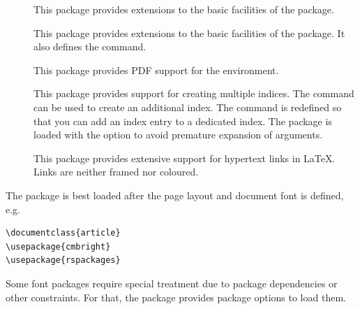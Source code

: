 \documentclass{scrartcl}
\begin{document}
\begin{description}
\item[\href{https://mirrors.ctan.org/macros/latex/contrib/xcolor/xcolor.pdf}{}]
This package provides extensions to the basic facilities of the
 package.

\item[\href{https://mirrors.ctan.org/macros/latex/required/graphics/grfguide.pdf}{}]
This package provides extensions to the basic facilities of the
 package.  It also defines the 
command.

\item[\href{https://mirrors.ctan.org/macros/latex/contrib/pdflscape/pdflscape.pdf}{}]
This package provides PDF support for the  environment.

\item[\href{https://mirrors.ctan.org/macros/latex/contrib/splitindex/splitidx.pdf}{}]
This package provides support for creating multiple indices.  The
\symb{\newindex} command can be used to create an additional index.
The \symb{\index} command is redefined so that you can add an index
entry to a dedicated index.  The  package is loaded
with the  option to avoid premature expansion of
\symb{\index} arguments.

\item[\href{https://mirrors.ctan.org/macros/latex/contrib/hyperref/doc/hyperref-doc.pdf}{}]
This package provides extensive support for hypertext links in
\LaTeX{}.  Links are neither framed nor coloured.
\end{description}

The  package is best loaded after the page layout and
document font is defined, e.g.
\begin{display}
\begin{verbatim}
\documentclass{article}
\usepackage{cmbright}
\usepackage{rspackages}
\end{verbatim}
\end{display}
Some font packages require special treatment due to package
dependencies or other constraints.  For that, the 
package provides package options to load them.
\end{document}
